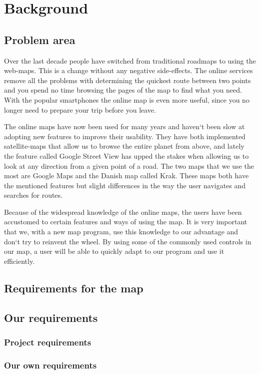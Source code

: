 \chapter{Background}
\label{BG}
\section{Problem area}
\label{BG-PR}
Over the last decade people have switched from traditional roadmaps 
to using the web-maps. This is a change without any negative side-effects. 
The online services remove all the problems with determining the quickest 
route between two points and you spend no time browsing the pages of 
the map to find what you need. With the popular smartphones the online 
map is even more useful, since you no longer need to prepare your trip 
before you leave.

The online maps have now been used for many years and haven`t been slow 
at adopting new features to improve their usability. They have both 
implemented satellite-maps that allow us to browse the entire planet 
from above, and lately the feature called Google Street View has upped 
the stakes when allowing us to look at any direction from a given point 
of a road. The two maps that we use the most are Google Maps and the 
Danish map called Krak. These maps both have the mentioned features 
but slight differences in the way the user navigates and searches 
for routes.

Because of the widespread knowledge of the online maps, the users 
have been accustomed to certain features and ways of using the map. 
It is very important that we, with a new map program, use this knowledge 
to our advantage and don`t try to reinvent the wheel. By using some 
of the commonly used controls in our map, a user will be able to quickly 
adapt to our program and use it efficiently. 

\section{Requirements for the map}
\label{BG-R}
\section{Our requirements}
\subsection{Project requirements}
\label{BG-R-PR}
\subsection{Our own requirements}
\label{BG-R-OOR}

